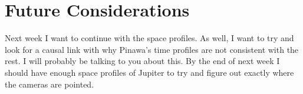 \documentclass[11pt]{article}
\begin{document}
\section{Future Considerations}
\hspace{0.5cm}

Next week I want to continue with the space profiles. As well, I want to try and look for a causal link with why Pinawa's time profiles are not consistent with the rest. I will probably be talking to you about this. By the end of next week I should have enough space profiles of Jupiter to try and figure out exactly where the cameras are pointed. 
\end{document}
